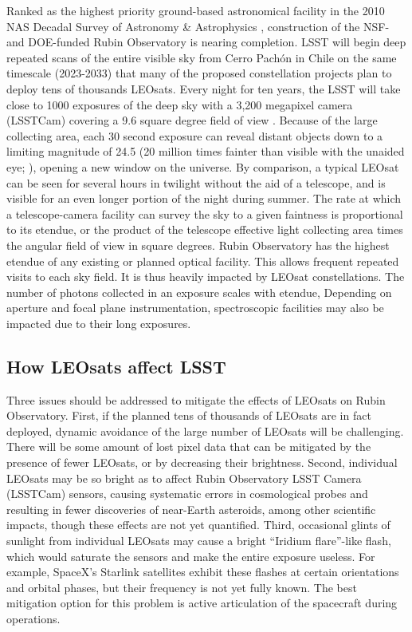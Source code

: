 \documentclass[twocolumn,trackchanges]{aastex63}
\begin{document}
Ranked as the highest priority ground-based astronomical facility in the 2010 NAS Decadal Survey of Astronomy \& Astrophysics \citep{NAP12951}, construction of the NSF- and DOE-funded Rubin Observatory is nearing completion. LSST will begin deep repeated scans of the entire visible sky from Cerro Pach\'on in Chile on the same timescale (2023-2033) that many of the proposed constellation projects plan to deploy tens of thousands LEOsats. Every night for ten years, the LSST will take close to 1000 exposures of the deep sky with a 3,200 megapixel camera (LSSTCam) covering a 9.6 square degree field of view \citep{2019ApJ...873..111I}. Because of the large collecting area, each 30 second exposure can reveal distant objects down to a limiting magnitude of 24.5 (20 million times fainter than visible with the unaided eye; \citealt{10.1093/mnras/stu992}), opening a new window on the universe.
By comparison, a typical LEOsat can be seen for several hours in twilight without the aid of a telescope, and is visible for an even longer portion of the night during summer. The rate at which a telescope-camera facility can survey the sky to a given faintness is proportional to its etendue, or the product of the telescope effective light collecting area times the angular field of view in square degrees. Rubin Observatory has the highest etendue of any existing or planned optical facility. This allows frequent repeated visits to each sky field. It is thus heavily impacted by LEOsat constellations. The number of photons collected in an exposure scales with etendue,   Depending on aperture and focal plane instrumentation, spectroscopic facilities may also be impacted due to their long exposures.


\subsection{How LEOsats affect LSST} \label{subsec:impact}

Three issues should be addressed to mitigate the effects of LEOsats on Rubin Observatory.
First, if the planned tens of thousands of LEOsats are in fact deployed, dynamic avoidance of the large number of LEOsats will be challenging. There will be some amount of lost pixel data that can be mitigated by the presence of fewer LEOsats, or by decreasing their brightness.
Second, individual LEOsats may be so bright as to affect Rubin Observatory LSST Camera (LSSTCam) sensors, causing systematic errors in cosmological probes and resulting in fewer discoveries of near-Earth asteroids, among other scientific impacts, though these effects are not yet quantified.
Third, occasional glints of sunlight from individual LEOsats may cause a bright ``Iridium flare''-like flash, which would saturate the sensors and make the entire exposure useless. For example, SpaceX's Starlink satellites exhibit these flashes at certain orientations and orbital phases, but their frequency is not yet fully known. The best mitigation option for this problem is active articulation of the spacecraft during operations.
\end{document}
